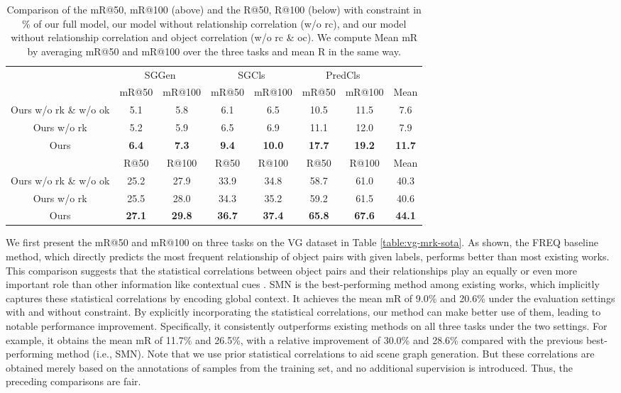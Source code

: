 \documentclass[10pt,twocolumn,letterpaper]{article}
\begin{document}
\begin{table*}[htp]
\centering
\small
\begin{tabular}{c|cc|cc|cc|c}
\hline
  \centering \multirow{2}{*}{Methods} & \multicolumn{2}{|c|}{SGGen}  & \multicolumn{2}{c|}{SGCls} & \multicolumn{2}{c|}{PredCls}  \\
 & mR@50 & mR@100  & mR@50 & mR@100 & mR@50 & mR@100 & Mean  \\
\hline
\centering Ours w/o rk \& w/o ok & 5.1 & 5.8 & 6.1& 6.5 & 10.5 & 11.5 & 7.6\\
\centering Ours w/o rk &  5.2 & 5.9  & 6.5 & 6.9 & 11.1 & 12.0 & 7.9 \\
\centering Ours & \textbf{6.4} & \textbf{7.3} & \textbf{9.4} & \textbf{10.0} & \textbf{17.7} & \textbf{19.2} & \textbf{11.7}  \\
\hline
\hline 
& R@50 & R@100  & R@50 & R@100 & R@50 & R@100 & Mean  \\
\hline
\centering Ours w/o rk \& w/o ok & 25.2 & 27.9 & 33.9 & 34.8 & 58.7 & 61.0 & 40.3 \\
\centering Ours w/o rk & 25.5 & 28.0 & 34.3 & 35.2 & 59.2 & 61.5 & 40.6\\ 
\centering Ours & \textbf{27.1} & \textbf{29.8}  & \textbf{36.7} & \textbf{37.4}&  \textbf{65.8} & \textbf{67.6}& \textbf{44.1}    \\
\hline
\end{tabular}
\caption{Comparison of the mR@50, mR@100 (above) and the R@50, R@100 (below) with constraint in \% of our full model, our model without relationship correlation (w/o rc), and our model without relationship correlation and object correlation (w/o rc \& oc). We compute Mean mR by averaging mR@50 and mR@100 over the three tasks and mean R in the same way.}
\label{table:vg-mrk-ablation}
\end{table*}

We first present the mR@50 and mR@100 on three tasks on the VG dataset in Table \ref{table:vg-mrk-sota}. As shown, the  FREQ baseline method, which directly predicts the most frequent relationship of object pairs with given labels, performs better than most existing works. This comparison suggests that the statistical correlations between object pairs and their relationships play an equally or even more important role than other information like contextual cues \cite{xu2017scene}. SMN is the best-performing method among existing works, which implicitly captures these statistical correlations by encoding global context. It achieves the mean mR of 9.0\% and 20.6\% under the evaluation settings with and without constraint. By explicitly incorporating the statistical correlations, our method can make better use of them, leading to notable performance improvement. Specifically, it consistently outperforms existing methods on all three tasks under the two settings. For example, it obtains the mean mR of 11.7\% and 26.5\%, with a relative improvement of 30.0\% and 28.6\% compared with the previous best-performing method (i.e., SMN). Note that we use prior statistical correlations to aid scene graph generation. But these correlations are obtained merely based on the annotations of samples from the training set, and no additional supervision is introduced. Thus, the preceding comparisons are fair. 
\end{document}
